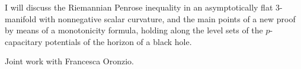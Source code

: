 \mypage
{}
\begin{myabstract}
I will discuss the Riemannian Penrose inequality 
in an asymptotically flat $3$-manifold with 
nonnegative scalar curvature, and the main points of 
a new proof by means of a monotonicity formula, 
holding along the level sets of the $p$-capacitary 
potentials of the horizon of a black hole.

Joint work with Francesca Oronzio.
\end{myabstract}

